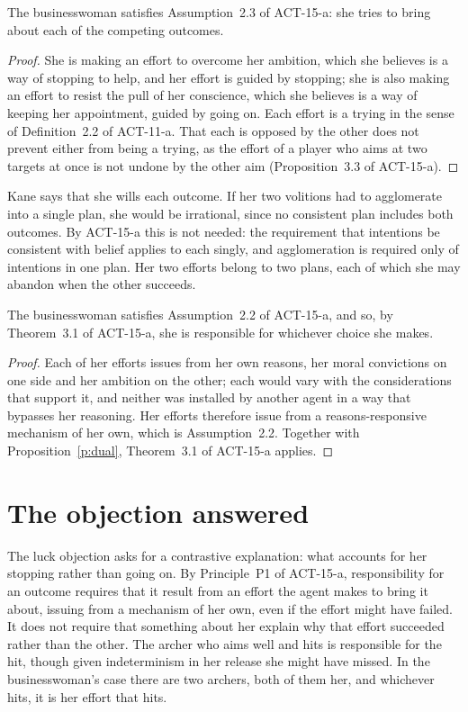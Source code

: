 \documentclass{situationist-preprint}
\begin{document}
\begin{proposition}\label{p:dual}
The businesswoman satisfies Assumption~2.3 of ACT-15-a: she tries to bring about each of the competing outcomes.
\end{proposition}

\begin{proof}
She is making an effort to overcome her ambition, which she believes is a way of stopping to help, and her effort is guided by stopping; she is also making an effort to resist the pull of her conscience, which she believes is a way of keeping her appointment, guided by going on. Each effort is a trying in the sense of Definition~2.2 of ACT-11-a. That each is opposed by the other does not prevent either from being a trying, as the effort of a player who aims at two targets at once is not undone by the other aim (Proposition~3.3 of ACT-15-a).
\end{proof}

Kane says that she wills each outcome. If her two volitions had to agglomerate into a single plan, she would be irrational, since no consistent plan includes both outcomes. By ACT-15-a this is not needed: the requirement that intentions be consistent with belief applies to each singly, and agglomeration is required only of intentions in one plan. Her two efforts belong to two plans, each of which she may abandon when the other succeeds.

\begin{proposition}\label{p:control}
The businesswoman satisfies Assumption~2.2 of ACT-15-a, and so, by Theorem~3.1 of ACT-15-a, she is responsible for whichever choice she makes.
\end{proposition}

\begin{proof}
Each of her efforts issues from her own reasons, her moral convictions on one side and her ambition on the other; each would vary with the considerations that support it, and neither was installed by another agent in a way that bypasses her reasoning. Her efforts therefore issue from a reasons-responsive mechanism of her own, which is Assumption~2.2. Together with Proposition~\ref{p:dual}, Theorem~3.1 of ACT-15-a applies.
\end{proof}

\section{The objection answered}

The luck objection asks for a contrastive explanation: what accounts for her stopping rather than going on. By Principle~P1 of ACT-15-a, responsibility for an outcome requires that it result from an effort the agent makes to bring it about, issuing from a mechanism of her own, even if the effort might have failed. It does not require that something about her explain why that effort succeeded rather than the other. The archer who aims well and hits is responsible for the hit, though given indeterminism in her release she might have missed. In the businesswoman's case there are two archers, both of them her, and whichever hits, it is her effort that hits.
\end{document}
